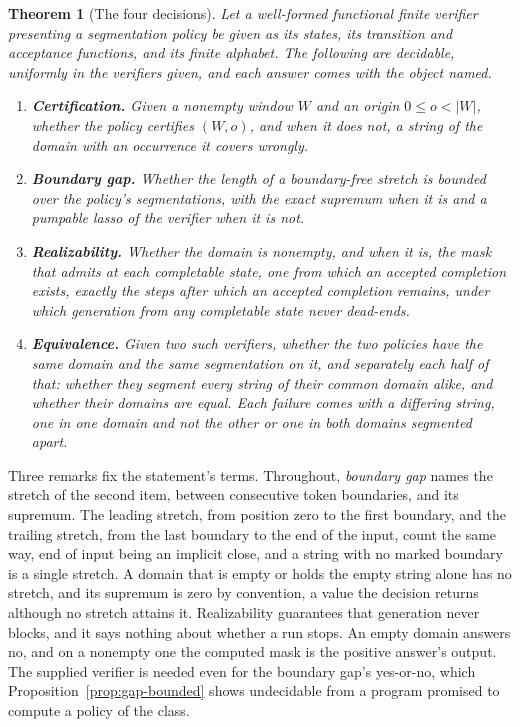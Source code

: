 \documentclass[11pt,a4paper]{article}
\theoremstyle{definition}
\theoremstyle{plain}
\newtheorem{theorem}{Theorem}
\begin{document}
\begin{theorem}[The four decisions]\label{thm:four} Let a well-formed functional finite verifier presenting a
segmentation policy be given as its states, its transition and acceptance functions, and its finite alphabet. The
following are decidable, uniformly in the verifiers given, and each answer comes with the object named.
\begin{enumerate}
\item \textbf{Certification.} Given a nonempty window $W$ and an origin $0 \le o < |W|$, whether the policy certifies
$(W,o)$, and when it does not, a string of the domain with an occurrence it covers wrongly.
\item \textbf{Boundary gap.} Whether the length of a boundary-free stretch is bounded over the policy's segmentations,
with the exact supremum when it is and a pumpable lasso of the verifier when it is not.
\item \textbf{Realizability.} Whether the domain is nonempty, and when it is, the mask that admits at each
\emph{completable} state, one from which an accepted completion exists, exactly the steps after which an accepted
completion remains, under which generation from any completable state never dead-ends.
\item \textbf{Equivalence.} Given two such verifiers, whether the two policies have the same domain and the same
segmentation on it, and separately each half of that: whether they segment every string of their common domain alike,
and whether their domains are equal. Each failure comes with a differing string, one in one domain and not the other or
one in both domains segmented apart.
\end{enumerate}
\end{theorem}

Three remarks fix the statement's terms. Throughout, \emph{boundary gap} names the stretch of the second item, between
consecutive token boundaries, and its supremum. The leading stretch, from position zero to the first boundary, and the
trailing stretch, from the last boundary to the end of the input, count the same way, end of input being an implicit
close, and a string with no marked boundary is a single stretch. A domain that is empty or holds the empty string alone
has no stretch, and its supremum is zero by convention, a value the decision returns although no stretch attains it.
Realizability guarantees that generation never blocks, and it says nothing about whether a run stops. An empty domain
answers no, and on a nonempty one the computed mask is the positive answer's output. The supplied verifier is needed
even for the boundary gap's yes-or-no, which Proposition~\ref{prop:gap-bounded} shows undecidable from a program
promised to compute a policy of the class.
\end{document}
